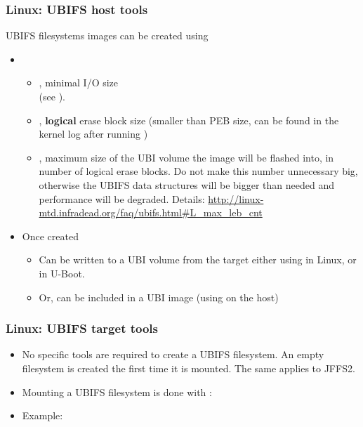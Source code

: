 \begin{frame}
  \frametitle{Linux: UBIFS host tools}
  UBIFS filesystems images can be created using 
    \begin{itemize}
    \item {}
      \begin{itemize}
      \item {}, minimal I/O size\\
                 (see ).
      \item {}, {\bf logical} erase block size (smaller than
                 PEB size, can be found in the kernel log after running
		 )
      \item {}, maximum size of the UBI volume the image
        will be flashed into, in number of logical erase blocks.
        Do not make this number unnecessary big, otherwise the UBIFS
        data structures will be bigger than needed and performance
        will be degraded. Details:
        {\scriptsize\url{http://linux-mtd.infradead.org/faq/ubifs.html\#L_max_leb_cnt}}
      \end{itemize}
    \item Once created
      \begin{itemize}
      \item Can be written to a UBI volume from the target either using
         in Linux, or  in U-Boot.
      \item Or, can be included in a UBI image (using 
        on the host)
      \end{itemize}
    \end{itemize}
\end{frame}

\begin{frame}
  \frametitle{Linux: UBIFS target tools}
  \begin{itemize}
  \item No specific tools are required to create a UBIFS filesystem.
	An empty filesystem is created the first time it is mounted.
        The same applies to JFFS2.
  \item Mounting a UBIFS filesystem is done with :\\
  \item Example:\\
  \end{itemize}
\end{frame}

